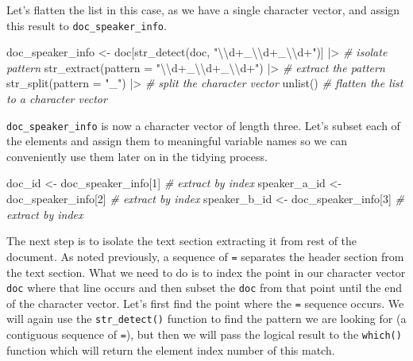 \documentclass[
  letterpaper,
  DIV=11,
  numbers=noendperiod]{scrreport}
\newenvironment{Shaded}{\begin{snugshade}}{\end{snugshade}}
\newcommand{\AttributeTok}[1]{\textcolor[rgb]{0.00,0.00,0.00}{#1}}
\newcommand{\CommentTok}[1]{\textcolor[rgb]{0.00,0.00,0.00}{\textit{#1}}}
\newcommand{\DecValTok}[1]{\textcolor[rgb]{0.00,0.00,0.00}{#1}}
\newcommand{\FunctionTok}[1]{\textcolor[rgb]{0.00,0.00,0.00}{#1}}
\newcommand{\NormalTok}[1]{\textcolor[rgb]{0.00,0.00,0.00}{#1}}
\newcommand{\OtherTok}[1]{\textcolor[rgb]{0.00,0.00,0.00}{#1}}
\newcommand{\SpecialCharTok}[1]{\textcolor[rgb]{0.00,0.00,0.00}{#1}}
\newcommand{\StringTok}[1]{\textcolor[rgb]{0.00,0.00,0.00}{#1}}
\theoremstyle{definition}
\theoremstyle{remark}
\begin{document}
Let's flatten the list in this case, as we have a single character
vector, and assign this result to \texttt{doc\_speaker\_info}.

\begin{Shaded}
\begin{Highlighting}[]
\NormalTok{doc\_speaker\_info }\OtherTok{\textless{}{-}} 
\NormalTok{  doc[}\FunctionTok{str\_detect}\NormalTok{(doc, }\StringTok{"}\SpecialCharTok{\textbackslash{}\textbackslash{}}\StringTok{d+\_}\SpecialCharTok{\textbackslash{}\textbackslash{}}\StringTok{d+\_}\SpecialCharTok{\textbackslash{}\textbackslash{}}\StringTok{d+"}\NormalTok{)] }\SpecialCharTok{|\textgreater{}} \CommentTok{\# isolate pattern}
  \FunctionTok{str\_extract}\NormalTok{(}\AttributeTok{pattern =} \StringTok{"}\SpecialCharTok{\textbackslash{}\textbackslash{}}\StringTok{d+\_}\SpecialCharTok{\textbackslash{}\textbackslash{}}\StringTok{d+\_}\SpecialCharTok{\textbackslash{}\textbackslash{}}\StringTok{d+"}\NormalTok{) }\SpecialCharTok{|\textgreater{}} \CommentTok{\# extract the pattern}
  \FunctionTok{str\_split}\NormalTok{(}\AttributeTok{pattern =} \StringTok{"\_"}\NormalTok{) }\SpecialCharTok{|\textgreater{}}  \CommentTok{\# split the character vector}
  \FunctionTok{unlist}\NormalTok{() }\CommentTok{\# flatten the list to a character vector}
\end{Highlighting}
\end{Shaded}

\texttt{doc\_speaker\_info} is now a character vector of length three.
Let's subset each of the elements and assign them to meaningful variable
names so we can conveniently use them later on in the tidying process.

\begin{Shaded}
\begin{Highlighting}[]
\NormalTok{doc\_id }\OtherTok{\textless{}{-}}\NormalTok{ doc\_speaker\_info[}\DecValTok{1}\NormalTok{] }\CommentTok{\# extract by index}
\NormalTok{speaker\_a\_id }\OtherTok{\textless{}{-}}\NormalTok{ doc\_speaker\_info[}\DecValTok{2}\NormalTok{] }\CommentTok{\# extract by index}
\NormalTok{speaker\_b\_id }\OtherTok{\textless{}{-}}\NormalTok{ doc\_speaker\_info[}\DecValTok{3}\NormalTok{] }\CommentTok{\# extract by index}
\end{Highlighting}
\end{Shaded}

The next step is to isolate the text section extracting it from rest of
the document. As noted previously, a sequence of \texttt{=} separates
the header section from the text section. What we need to do is to index
the point in our character vector \texttt{doc} where that line occurs
and then subset the \texttt{doc} from that point until the end of the
character vector. Let's first find the point where the \texttt{=}
sequence occurs. We will again use the \texttt{str\_detect()} function
to find the pattern we are looking for (a contiguous sequence of
\texttt{=}), but then we will pass the logical result to the
\texttt{which()} function which will return the element index number of
this match.
\end{document}
